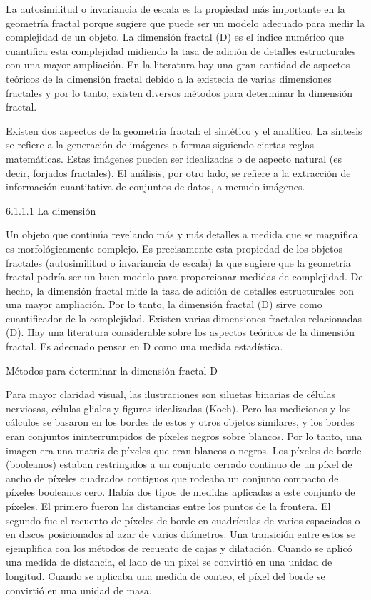 \documentclass[11pt]{article}
\begin{document}
La autosimilitud o invariancia de escala es la propiedad más importante en la geometría fractal  porque sugiere que puede ser un modelo adecuado para medir la complejidad de un objeto. La dimensión fractal (D) es el índice numérico que cuantifica esta complejidad midiendo la tasa de adición de detalles estructurales con una mayor ampliación.  En la literatura hay una gran cantidad de aspectos teóricos de la dimensión fractal debido a la existecia de varias dimensiones fractales y por lo tanto, existen diversos métodos para determinar la dimensión fractal.


Existen dos aspectos de la geometría fractal: el sintético y el analítico. La síntesis se refiere a la generación de imágenes o formas siguiendo ciertas reglas matemáticas. Estas imágenes pueden ser idealizadas o de aspecto natural (es decir, forjados fractales).  El análisis, por otro lado, se refiere a la extracción de información cuantitativa de conjuntos de datos, a menudo imágenes. 



6.1.1.1 La dimensión 

Un objeto que continúa revelando más y más detalles a medida que se magnifica es morfológicamente complejo. Es precisamente esta propiedad de los objetos fractales (autosimilitud o invariancia de escala) la que sugiere que la geometría fractal podría ser un buen modelo para proporcionar medidas de complejidad. De hecho, la dimensión fractal mide la tasa de adición de detalles estructurales con una mayor ampliación. Por lo tanto, la dimensión fractal (D) sirve como cuantificador de la complejidad. Existen varias dimensiones fractales relacionadas (D). Hay una literatura considerable sobre los aspectos teóricos de la dimensión fractal. Es adecuado pensar en D como una medida estadística.

 Métodos para determinar la dimensión fractal D

Para mayor claridad visual, las ilustraciones son siluetas binarias de células nerviosas, células gliales y figuras idealizadas (Koch). Pero las mediciones y los cálculos se basaron en los bordes de estos y otros objetos similares, y los bordes eran conjuntos ininterrumpidos de píxeles negros sobre blancos. Por lo tanto, una imagen era una matriz de píxeles que eran blancos o negros. Los píxeles de borde (booleanos) estaban restringidos a un conjunto cerrado continuo de un píxel de ancho de píxeles cuadrados contiguos que rodeaba un conjunto compacto de píxeles booleanos cero. Había dos tipos de medidas aplicadas a este conjunto de píxeles. El primero fueron las distancias entre los puntos de la frontera. El segundo fue el recuento de píxeles de borde en cuadrículas de varios espaciados o en discos posicionados al azar de varios diámetros. Una transición entre estos se ejemplifica con los métodos de recuento de cajas y dilatación. Cuando se aplicó una medida de distancia, el lado de un píxel se convirtió en una unidad de longitud. Cuando se aplicaba una medida de conteo, el píxel del borde se convirtió en una unidad de masa.
\end{document}
